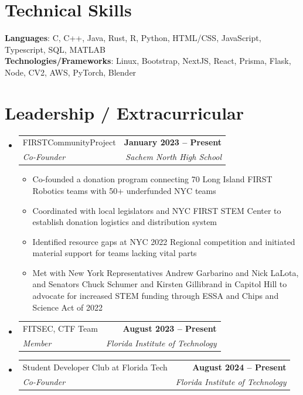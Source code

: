 \documentclass[letterpaper,11pt]{article}
\makeatletter
\newcommand{\resumeItem}[1]{
  \item\small{
    {#1 \vspace{-2pt}}
  }
}
\newcommand{\resumeSubheading}[4]{
  \vspace{-2pt}\item
    \begin{tabular*}{1.0\textwidth}[t]{l@{\extracolsep{\fill}}r}
      \small#1 & \textbf{\small #2} \\
      \textit{\small#3} & \textit{\small #4} \\
    \end{tabular*}\vspace{-9pt}
}
\newcommand{\resumeSubHeadingListStart}{\begin{itemize}[leftmargin=0.0in, label={}]}
\newcommand{\resumeSubHeadingListEnd}{\end{itemize}}
\newcommand{\resumeItemListStart}{\begin{itemize}}
\newcommand{\resumeItemListEnd}{\end{itemize}\vspace{-5pt}}
\makeatother
\begin{document}
\vspace{-17pt}
\section{Technical Skills}
 \begin{itemize}[leftmargin=0.15in, label={}]
    \small{\item{
     \textbf{Languages}{: C, C++, Java, Rust, R, Python, HTML/CSS, JavaScript, Typescript, SQL, MATLAB} \\
     \textbf{Technologies/Frameworks}{: Linux, Bootstrap, NextJS, React, Prisma, Flask, Node, CV2, AWS, PyTorch, Blender} \\
    }}
 \end{itemize}
\vspace{-20pt}


\section{Leadership / Extracurricular}
    \resumeSubHeadingListStart
        \resumeSubheading{FIRSTCommunityProject}{January 2023 -- Present}
        {Co-Founder}{Sachem North High School}
            \resumeItemListStart
                \resumeItem{Co-founded a donation program connecting 70 Long Island FIRST Robotics teams with 50+ underfunded NYC teams}
                \resumeItem{Coordinated with local legislators and NYC FIRST STEM Center to establish donation logistics and distribution system}
                \resumeItem{Identified resource gaps at NYC 2022 Regional competition and initiated material support for teams lacking vital parts}
                \resumeItem{Met with New York Representatives Andrew Garbarino and Nick LaLota, and Senators Chuck Schumer and Kirsten Gillibrand in Capitol Hill to advocate for increased STEM funding through ESSA and Chips and Science Act of 2022}
            \resumeItemListEnd
        \resumeSubheading{FITSEC, CTF Team}{August 2023 -- Present}{Member}{Florida Institute of Technology}
        \resumeSubheading{Student Developer Club at Florida Tech}{August 2024 -- Present}{Co-Founder}{Florida Institute of Technology}
        
    \resumeSubHeadingListEnd
\vspace{-20pt}
\end{document}
